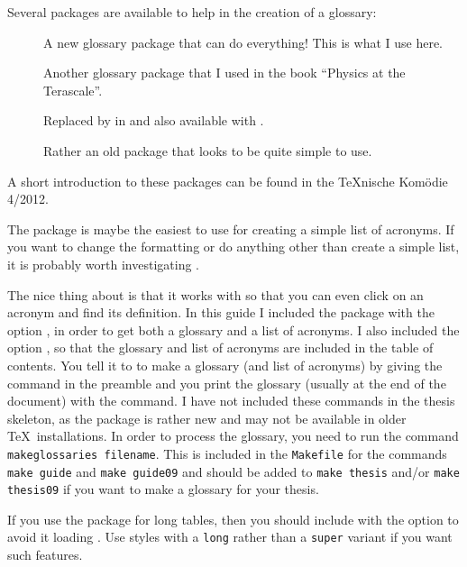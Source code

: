 Several packages are available to help in the creation of a glossary:
\begin{description}
\item[] A new glossary package that can do
  everything! This is what I use here.
\item[] Another glossary package that I used in the book
  \enquote{Physics at the Terascale}.
\item[] Replaced by  in
   and also available with .
\item[] Rather an old package that looks to be quite
  simple to use.
\end{description}

A short introduction to these packages can be found in the \TeX nische
Komödie 4/2012.

The  package is maybe the easiest to use for creating
a simple list of acronyms. If you want to change the formatting or do
anything other than create a simple list, it is probably worth
investigating .

The nice thing about  is that it works with
 so that you can even click on an acronym and find
its definition. In this guide I included the package with the option
, in order to get both a glossary and a list of
acronyms. I also included the option , so that the
glossary and list of acronyms are included in the table of
contents. You tell it to to make a glossary (and list of acronyms) by
giving the command  in the preamble and you
print the glossary (usually at the end of the document) with the
 command. I have not included these commands in
the thesis skeleton, as the  package is rather new
and may not be available in older \TeX\ installations. In order to
process the glossary, you need to run the command
\texttt{makeglossaries filename}. This is included in the
\texttt{Makefile} for the commands \texttt{make guide} and
\texttt{make guide09} and should be added to \texttt{make thesis}
and/or \texttt{make thesis09} if you want to make a glossary for your
thesis.

If you use the package  for long tables,
then you should include  with the option 
to avoid it loading .
Use styles with a \texttt{long} rather than a \texttt{super} variant if you want such features.

